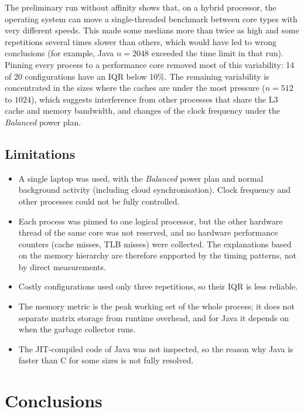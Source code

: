 \documentclass[12pt,a4paper]{report}
\begin{document}
The preliminary run without affinity shows that, on a hybrid processor, the operating system can move a
single-threaded benchmark between core types with very different speeds. This made some medians more than twice as high
and some repetitions several times slower than others, which would have led to wrong conclusions (for example, Java
$n = 2048$ exceeded the time limit in that run). Pinning every process to a performance core removed most of this
variability: 14 of 20 configurations have an IQR below 10\%. The remaining variability is concentrated in the sizes
where the caches are under the most pressure ($n = 512$ to $1024$), which suggests interference from other processes
that share the L3 cache and memory bandwidth, and changes of the clock frequency under the \textit{Balanced} power plan.

\section{Limitations}

\begin{itemize}
  \item A single laptop was used, with the \textit{Balanced} power plan and normal background activity (including cloud
  synchronisation). Clock frequency and other processes could not be fully controlled.
  \item Each process was pinned to one logical processor, but the other hardware thread of the same core was not
  reserved, and no hardware performance counters (cache misses, TLB misses) were collected. The explanations based on
  the memory hierarchy are therefore supported by the timing patterns, not by direct measurements.
  \item Costly configurations used only three repetitions, so their IQR is less reliable.
  \item The memory metric is the peak working set of the whole process; it does not separate matrix storage from
  runtime overhead, and for Java it depends on when the garbage collector runs.
  \item The JIT-compiled code of Java was not inspected, so the reason why Java is faster than C for some sizes is not
  fully resolved.
\end{itemize}

\chapter{Conclusions}
\end{document}
